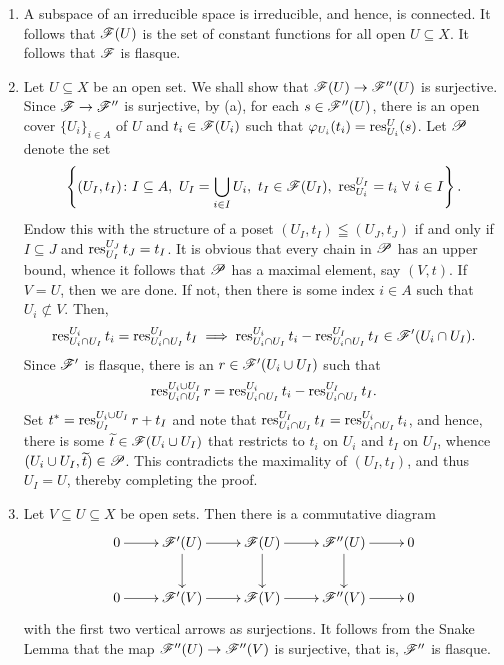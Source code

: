 \begin{exercise}
\begin{enumerate}[label=(\alph*)]
    \item A subspace of an irreducible space is irreducible, and hence, is connected. It follows that $\mathscr{F}(U)$ is the set of constant functions for all open $U\subseteq X$. It follows that $\mathscr{F}$ is flasque. 

    \item Let $U\subseteq X$ be an open set. We shall show that $\mathscr{F}(U)\to\mathscr{F}''(U)$ is surjective. Since $\mathscr{F}\to\mathscr{F}''$ is surjective, by (a), for each $s\in\mathscr{F}''(U)$, there is an open cover $\{U_i\}_{i\in A}$ of $U$ and $t_i\in\mathscr{F}(U_i)$ such that $\varphi_{U_i}(t_i) = \operatorname{res}^{U}_{U_i}(s)$. Let $\mathscr{P}$ denote the set 
    \begin{equation*}
        \left\{(U_I, t_I)\colon I\subseteq A,~U_I = \bigcup_{i\in I} U_i,~t_I\in\mathscr{F}(U_I),~\operatorname{res}^{U_I}_{U_i} = t_i~\forall~i\in I\right\}.
    \end{equation*}
    Endow this with the structure of a poset $(U_I, t_I)\leqq(U_J, t_J)$ if and only if $I\subseteq J$ and $\operatorname{res}^{U_J}_{U_I} t_J = t_I$. It is obvious that every chain in $\mathscr{P}$ has an upper bound, whence it follows that $\mathscr{P}$ has a maximal element, say $(V, t)$. If $V = U$, then we are done. If not, then there is some index $i\in A$ such that $U_i\not\subset V$. Then, 
    \begin{equation*}
        \operatorname{res}^{U_i}_{U_i\cap U_I}t_i = \operatorname{res}^{U_I}_{U_i\cap U_I} t_I\implies \operatorname{res}^{U_i}_{U_i\cap U_I}t_i - \operatorname{res}^{U_I}_{U_i\cap U_I} t_I\in\mathscr{F}'(U_i\cap U_I).
    \end{equation*}
    Since $\mathscr{F}'$ is flasque, there is an $r\in\mathscr{F}'(U_i\cup U_I)$ such that 
    \begin{equation*}
        \operatorname{res}^{U_i\cup U_{I}}_{U_i\cap U_I}r = \operatorname{res}^{U_i}_{U_i\cap U_I}t_i - \operatorname{res}^{U_I}_{U_i\cap U_I} t_I.
    \end{equation*}
    Set $t^\ast = \operatorname{res}^{U_i\cup U_I}_{U_I} r + t_I$ and note that $\operatorname{res}^{U_I}_{U_i\cap U_I} t_I = \operatorname{res}^{U_i}_{U_i\cap U_I} t_i$, and hence, there is some $\widetilde{t}\in\mathscr{F}(U_i\cup U_I)$ that restricts to $t_i$ on $U_i$ and $t_I$ on $U_I$, whence $(U_i\cup U_I, \widetilde{t})\in\mathscr{P}$. This contradicts the maximality of $(U_I, t_I)$, and thus $U_I = U$, thereby completing the proof. 

    \item Let $V\subseteq U\subseteq X$ be open sets. Then there is a commutative diagram 
    \begin{equation*}
        \xymatrix {
            0\ar[r] & \scrF'(U)\ar[r]\ar[d] & \scrF(U)\ar[r]\ar[d] & \scrF''(U)\ar[r]\ar[d] & 0\\
            0\ar[r] & \scrF'(V)\ar[r] & \scrF(V)\ar[r] & \scrF''(V)\ar[r] & 0
        }
    \end{equation*}
    with the first two vertical arrows as surjections. It follows from the Snake Lemma that the map $\mathscr{F}''(U)\to\mathscr{F}''(V)$ is surjective, that is, $\mathscr{F}''$ is flasque.


\end{enumerate}
\end{exercise}
